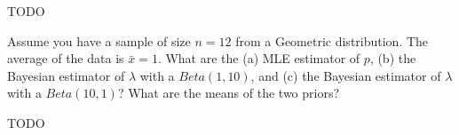 
TODO



Assume you have a sample of size $n = 12$ from a Geometric distribution. The 
average of the data is $\bar{x} = 1$. What are the (a) MLE estimator of $p$,
(b) the Bayesian estimator of $\lambda$ with a $Beta(1, 10)$, and (c) the
Bayesian estimator of $\lambda$ with a $Beta(10, 1)$? What are the means of
the two priors?


TODO